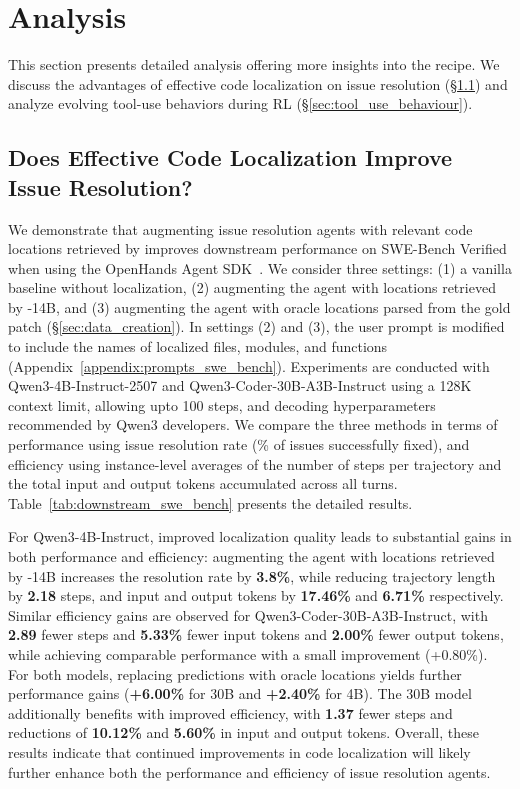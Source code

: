 \section{Analysis}
This section presents detailed analysis offering more insights into the \methodname recipe. We discuss the advantages of effective code localization on issue resolution (\S\ref{sec:downstream_swebench}) and analyze evolving tool-use behaviors during RL (\S\ref{sec:tool_use_behaviour}).

\subsection{Does Effective Code Localization Improve Issue Resolution?}\label{sec:downstream_swebench}



We demonstrate that augmenting issue resolution agents with relevant code locations retrieved by \methodname improves downstream performance on SWE-Bench Verified when using the OpenHands Agent SDK~\citep{wang2025openhandssoftwareagentsdk}. We consider three settings: (1) a vanilla baseline without localization, (2) augmenting the agent with locations retrieved by \methodname-14B, and (3) augmenting the agent with oracle locations parsed from the gold patch (\S\ref{sec:data_creation}). In settings (2) and (3), the user prompt is modified to include the names of localized files, modules, and functions (Appendix~\ref{appendix:prompts_swe_bench}). Experiments are conducted with Qwen3-4B-Instruct-2507 and Qwen3-Coder-30B-A3B-Instruct using a 128K context limit, allowing upto 100 steps, and decoding hyperparameters recommended by Qwen3 developers. We compare the three methods in terms of performance using issue resolution rate (\% of issues successfully fixed), and efficiency using instance-level averages of the number of steps per trajectory and the total input and output tokens accumulated across all turns. Table~\ref{tab:downstream_swe_bench} presents the detailed results.

For Qwen3-4B-Instruct, improved localization quality leads to substantial gains in both performance and efficiency: augmenting the agent with locations retrieved by \methodname-14B increases the resolution rate by \textbf{3.8\%}, while reducing trajectory length by \textbf{2.18} steps, and input and output tokens by \textbf{17.46\%} and \textbf{6.71\%} respectively. Similar efficiency gains are observed for Qwen3-Coder-30B-A3B-Instruct, with \textbf{2.89} fewer steps and \textbf{5.33\%} fewer input tokens and \textbf{2.00\%} fewer output tokens, while achieving comparable performance with a small improvement (+0.80\%). For both models, replacing \methodname predictions with oracle locations yields further performance gains (\textbf{+6.00\%} for 30B and \textbf{+2.40\%} for 4B). The 30B model additionally benefits with improved efficiency, with \textbf{1.37} fewer steps and reductions of \textbf{10.12\%} and \textbf{5.60\%} in input and output tokens. Overall, these results indicate that continued improvements in code localization will likely further enhance both the performance and efficiency of issue resolution agents.


